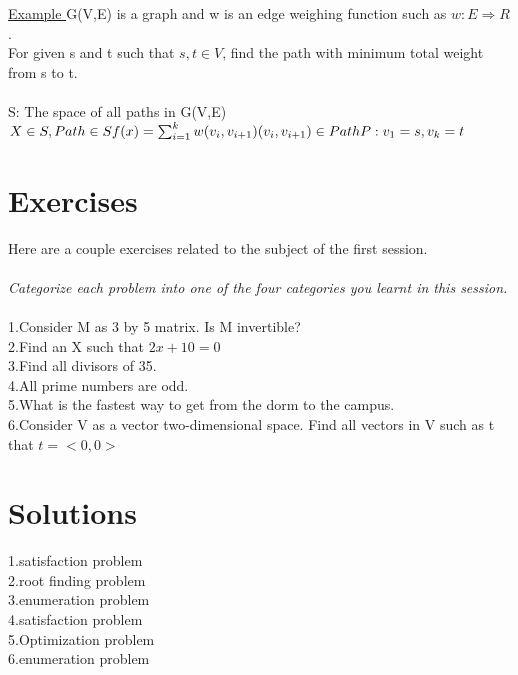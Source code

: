 \documentclass[twocolumn,a4paper, 10pt]{article}
\begin{document}
                    \underline{Example }
                        G(V,E) is a graph and w is an edge weighing function such as \begin{math}
                            w: E\Rightarrow R
                        \end{math}. \\ 
                        For given s and t such that \begin{math}
                            s,t \in V
                        \end{math}, find the path with minimum total weight from s to t. \\ \\ 
                        S: The space of all paths in G(V,E) \\
                        \begin{math}
                            X \in S, Path \in S \\ 
                            f(x) = \sum_{i = 1}^{k} w(v_i,v_{i+1}) \\ 
                            (v_i,v_{i+1}) \in Path \\ 
                            P: v_1 = s,     v_k = t
                        \end{math}

            \clearpage

    \section{Exercises}
        Here are a couple exercises related to the subject of the first session. \\ \\ 
        \emph{Categorize each problem into one of the four categories you learnt in this session.} \\ \\
        1.Consider M as 3 by 5 matrix. Is M invertible? \\
        2.Find an X such that \begin{math}
            2x + 10 = 0
        \end{math} \\ 
        3.Find all divisors of 35. \\ 
        4.All prime numbers are odd. \\ 
        5.What is the fastest way to get from the dorm to the campus. \\
        6.Consider V as a vector two-dimensional space. Find all vectors in V such as t that \begin{math}
            t = <0,0>
        \end{math} \\ 
        \clearpage
    \section{Solutions}
        1.satisfaction problem \\ 
        2.root finding problem \\ 
        3.enumeration problem \\ 
        4.satisfaction problem \\ 
        5.Optimization problem \\ 
        6.enumeration problem \\
\end{document}
